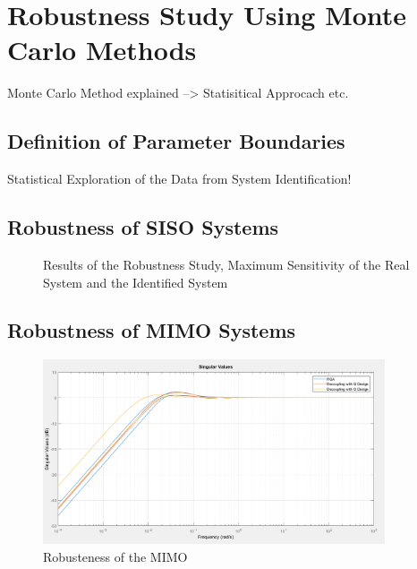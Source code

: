 \chapter{Robustness Study Using Monte Carlo Methods}
\label{c:robustness}

Monte Carlo Method explained --> Statisitical Approcach etc.

\section{Definition of Parameter Boundaries}%
\label{c:robustness:s:parameter}

Statistical Exploration of the Data from System Identification!

\section{Robustness of SISO Systems} %
\label{c:robustness:s:siso}

\begin{figure}[H]\centering

\caption{Results of the Robustness Study, Maximum Sensitivity of the Real System and the Identified System}
\label{c:control:f:robustness_study}

\end{figure}

\section{Robustness of MIMO Systems}
\label{c:robustness:s:mimo}

\begin{figure}[H]
\begin{minipage}[b]{\textwidth}
\centering
\includegraphics[width=0.9\textwidth]{./Graphics/SVD_MATLAB.png}
\caption{Robusteness of the MIMO}
\label{c:robustness:f:mimo_svd}
\end{minipage}
\end{figure}
